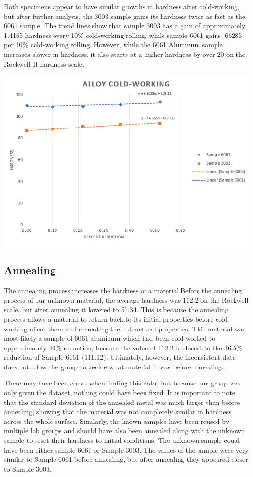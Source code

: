 \documentclass{article}
\begin{document}
Both specimens appear to have similar growths in hardness after cold-working, but after further analysis, the 3003 sample gains its hardness twice as fast as the 6061 sample. The trend lines show that sample 3003 has a gain of approximately 1.4165 hardness every 10\% cold-working rolling, while sample 6061 gains .66285 per 10\% cold-working rolling. However, while the 6061 Aluminum sample increases slower in hardness, it also starts at a higher hardness by over 20 on the Rockwell H hardness scale. 

\begin{center}
\includegraphics[width=450pt]{AlloyColdWorking.png}
\end{center}


\subsection{Annealing}

\indent The annealing process increases the hardness of a material.Before the annealing process of our unknown material, the average hardness was 112.2 on the Rockwell scale, but after annealing it lowered to 57.34. This is because the annealing process allows a material to return back to its initial properties before cold-working affect them and recreating their structural properties. This material was most likely a sample of 6061 aluminum which had been cold-worked to approximately 40\% reduction, because the value of 112.2 is closest to the 36.5\% reduction of Sample 6061 (111.12). Ultimately, however, the inconsistent data does not allow the group to decide what material it was before annealing.

\indent There may have been errors when finding this data, but because our group was only given the dataset, nothing could have been fixed. It is important to note that the standard deviation of the annealed metal was much larger than before annealing, showing that the material was not completely similar in hardness across the whole surface. Similarly, the known samples have been reused by multiple lab groups and should have also been annealed along with the unknown sample to reset their hardness to initial conditions. The unknown sample could have been either sample 6061 or Sample 3003. The values of the sample were very similar to Sample 6061 before annealing, but after annealing they appeared closer to Sample 3003. 
\end{document}
